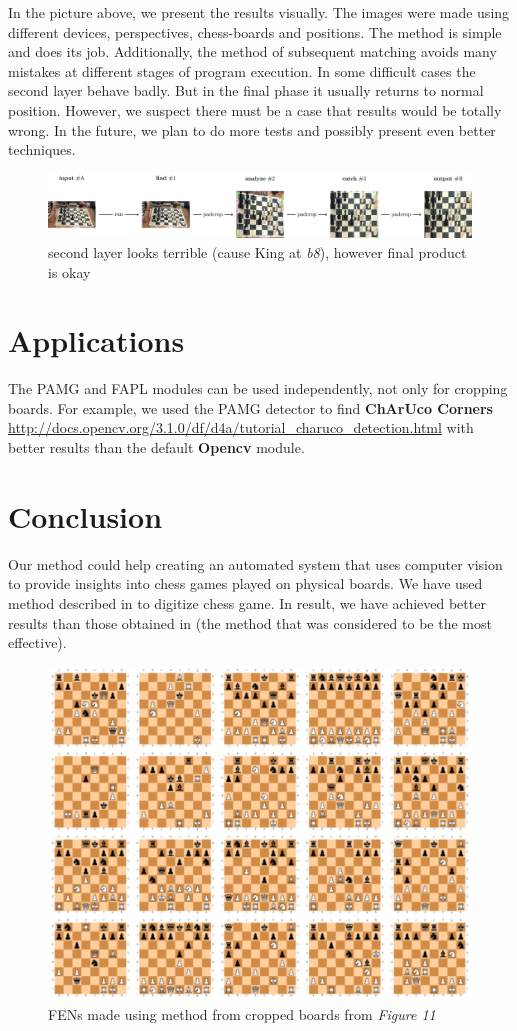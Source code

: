 \documentclass[letterpaper, 12pt]{article}
\begin{document}
In the picture above, we present the results visually.
The images were made using different devices, perspectives, chess-boards and positions.
The method is simple and does its job. Additionally, the method of subsequent matching avoids many mistakes at different
stages of program execution. In some difficult cases the second layer behave
badly. But in the final phase it usually returns to normal position. However, we suspect there must be a case that results would be totally wrong.
In the future, we plan to do more tests and possibly present even better techniques.

\begin{figure}[H]
\centering
\includegraphics[width=\columnwidth]{figure12}
\caption{second layer looks terrible (cause King at \textit{b8}), however final product is okay}
\end{figure}

\section{Applications}

The PAMG and FAPL modules can be used independently, not only for cropping boards.
For example, we used the PAMG detector to find \textbf{ChArUco Corners}
\url{http://docs.opencv.org/3.1.0/df/d4a/tutorial_charuco_detection.html} with
better results than the default \textbf{Opencv} module.

\section{Conclusion}

Our method could help creating an automated system that
uses computer vision to provide insights into chess games played on physical boards.
We have used method described in \cite{dingchessvision} to digitize chess game.
In result, we have achieved better results than those obtained in
\cite{danner2015visual} (the method that was considered to be the most effective).

\begin{figure}[H]
\centering
\includegraphics[width=0.6\columnwidth]{figure13}
\caption{FENs made using \cite{dingchessvision} method from cropped boards from
\textit{Figure 11}}
\end{figure}
\end{document}
